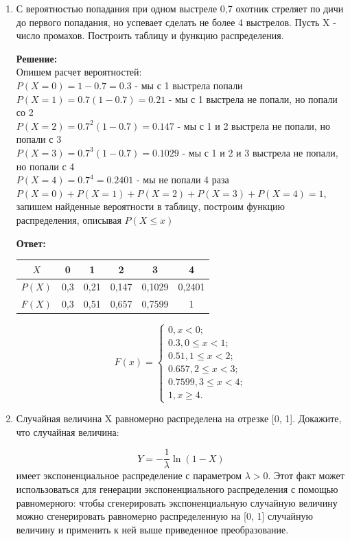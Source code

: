 \documentclass[a4paper,12pt]{article}
\renewcommand{\leq}{\leqslant}
\renewcommand{\geq}{\geqslant}
\begin{document}
\begin{enumerate}
\item	С вероятностью попадания при одном выстреле 0,7 охотник стреляет по дичи до первого попадания, но успевает сделать не более 4 выстрелов. Пусть X - число промахов. Построить таблицу и функцию распределения. 

\textbf{Решение:}\\
Опишем расчет вероятностей:\\
$P(X=0)=1-0.7=0.3$ - мы с 1 выстрела попали\\
$P(X=1)=0.7(1-0.7)=0.21$ - мы с 1 выстрела не попали, но попали со 2\\
$P(X=2)=0.7^2(1-0.7)=0.147$ - мы с 1 и 2 выстрела не попали, но попали с 3\\
$P(X=3)=0.7^3(1-0.7)=0.1029$ - мы с 1 и 2 и 3 выстрела не попали, но попали с 4\\
$P(X=4)=0.7^4=0.2401$ - мы не попали 4 раза\\

$P(X=0)+P(X=1)+P(X=2)+P(X=3)+P(X=4)=1$, запишем найденные вероятности в таблицу, построим функцию распределения, описывая $P(X\leq x)$

\textbf{Ответ:} 

\begin{center}
 \begin{tabular}{|c|c|c|c| c| c |} 
 \hline
 $X$ &0& 1& 2& 3&4\\ [0.5ex] 
 \hline
 $P(X)$& 0,3&	0,21&	0,147&	0,1029&	0,2401 \\ 
 \hline
 $F(X)$ &0,3&	0,51&	0,657&	0,7599	&1  \\ 
 \hline
\end{tabular}
\end{center}

\[
  F(x)=\begin{cases}
               0, x < 0;\\
               0.3, 0\leq x < 1;\\
               0.51, 1\leq x < 2;\\
               0.657, 2\leq x < 3;\\
               0.7599, 3\leq x < 4;\\
               1, x\geq4.
            \end{cases}
\]

\item	Случайная величина X равномерно распределена на отрезке [0, 1]. Докажите, что случайная величина:
 
$$Y = -\frac{1}{\lambda}\ln{(1-X)}$$
имеет экспоненциальное распределение с параметром $\lambda > 0$. Этот факт может использоваться для генерации экспоненциального распределения с помощью равномерного: чтобы сгенерировать экспоненциальную случайную величину можно сгенерировать равномерно распределенную на [0, 1] случайную величину и применить к ней выше приведенное преобразование. 


\end{enumerate}
\end{document}

